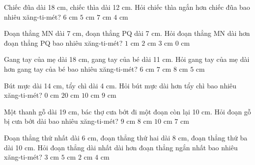 \begin{ex} %
Chiếc đũa dài 18 cm, chiếc thìa dài 12 cm. Hỏi chiếc thìa ngắn hơn chiếc đũa bao nhiêu xăng-ti-mét?
\choice
{\True $6\text{ cm}$}
{$5\text{ cm}$}
{$7\text{ cm}$}
{$4\text{ cm}$}
\end{ex}

\begin{ex} %
Đoạn thẳng MN dài 7 cm, đoạn thẳng PQ dài 7 cm. Hỏi đoạn thẳng MN dài hơn đoạn thẳng PQ bao nhiêu xăng-ti-mét?
\choice
{$1\text{ cm}$}
{$2\text{ cm}$}
{$3\text{ cm}$}
{\True $0\text{ cm}$}
\end{ex}

\begin{ex} %
Gang tay của mẹ dài 18 cm, gang tay của bé dài 11 cm. Hỏi gang tay của mẹ dài hơn gang tay của bé bao nhiêu xăng-ti-mét?
\choice
{$6\text{ cm}$}
{\True $7\text{ cm}$}
{$8\text{ cm}$}
{$5\text{ cm}$}
\end{ex}

\begin{ex} %
Bút mực dài 14 cm, tẩy chì dài 4 cm. Hỏi bút mực dài hơn tẩy chì bao nhiêu xăng-ti-mét?
\choice
{$0\text{ cm}$}
{$20\text{ cm}$}
{\True $10\text{ cm}$}
{$9\text{ cm}$}
\end{ex}

\begin{ex} %
Một thanh gỗ dài 19 cm, bác thợ cưa bớt đi một đoạn còn lại 10 cm. Hỏi đoạn gỗ bị cưa bớt dài bao nhiêu xăng-ti-mét?
\choice
{\True $9\text{ cm}$}
{$8\text{ cm}$}
{$10\text{ cm}$}
{$7\text{ cm}$}
\end{ex}

\begin{ex} %
Đoạn thẳng thứ nhất dài 6 cm, đoạn thẳng thứ hai dài 8 cm, đoạn thẳng thứ ba dài 10 cm. Hỏi đoạn thẳng dài nhất dài hơn đoạn thẳng ngắn nhất bao nhiêu xăng-ti-mét?
\choice
{$3\text{ cm}$}
{$5\text{ cm}$}
{$2\text{ cm}$}
{\True $4\text{ cm}$}
\end{ex}

